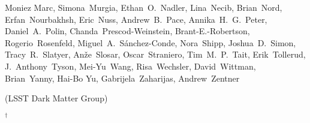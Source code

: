 \begin{raggedright}
Moniez Marc,
Simona~Murgia,
Ethan~O.~Nadler,
Lina~Necib,
Brian~Nord,
Erfan~Nourbakhsh,
Eric~Nuss,
Andrew~B.~Pace,
Annika~H.~G.~Peter,
Daniel~A.~Polin,
Chanda~Prescod-Weinstein,
Brant-E.-Robertson,
Rogerio~Rosenfeld,
Miguel~A.~S\'anchez-Conde,
Nora~Shipp,
Joshua~D.~Simon,
Tracy~R.~Slatyer,
An\v{z}e~Slosar,
Oscar~Straniero,
Tim~M.~P.~Tait,
Erik~Tollerud,
J.~Anthony~Tyson,
Mei-Yu~Wang,
Risa~Wechsler,
David~Wittman,
Brian~Yanny,
Hai-Bo Yu,
Gabrijela~Zaharijas,
Andrew~Zentner

\begin{center}
(LSST Dark Matter Group)
\end{center}

$^\dagger$ 

\begin{multicols}{2}
\scriptsize
\parskip=4pt




\end{multicols}
\end{raggedright}
